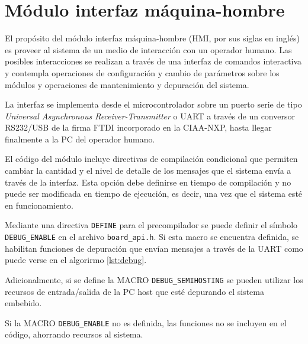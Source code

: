 \section{Módulo interfaz máquina-hombre}
\label{sec:HMI}

El propósito del módulo interfaz máquina-hombre (HMI, por sus siglas en inglés) es proveer al sistema de un medio de interacción con un operador humano. Las posibles interacciones se realizan a través de una interfaz de comandos interactiva y contempla operaciones de configuración y cambio de parámetros sobre los módulos y operaciones de mantenimiento y depuración del sistema.

La interfaz se implementa desde el microcontrolador sobre un puerto serie de tipo \textit{Universal Asynchronous Receiver-Transmitter} o UART a través de un conversor RS232/USB de la firma FTDI incorporado en la CIAA-NXP, hasta llegar finalmente a la PC del operador humano.

El código del módulo incluye directivas de compilación condicional que permiten cambiar la cantidad y el nivel de detalle de los mensajes que el sistema envía a través de la interfaz.  Esta opción debe definirse en tiempo de compilación y no puede ser modificada en tiempo de ejecución, es decir, una vez que el sistema esté en funcionamiento.

Mediante una directiva \texttt{DEFINE} para el precompilador se puede definir el símbolo \texttt{DEBUG\_ENABLE} en el archivo \texttt{board\_api.h}.   Si esta macro se encuentra definida, se habilitan funciones de depuración que envían mensajes a través de la UART como puede verse en el algorirmo \ref{lst:debug}.


Adicionalmente, si se define la MACRO \texttt{DEBUG\_SEMIHOSTING} se pueden utilizar los recursos de entrada/salida de la PC host que esté depurando el sistema embebido.

Si la MACRO \texttt{DEBUG\_ENABLE} no es definida, las funciones no se incluyen en el código, ahorrando recursos al sistema.

\vspace{10px}

